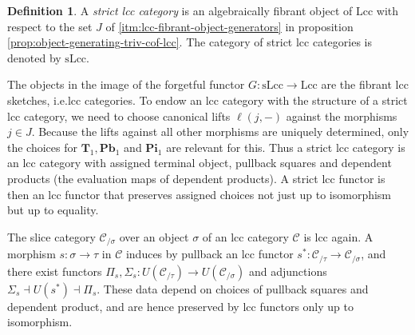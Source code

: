 \documentclass[a4paper]{article}
\theoremstyle{remark}
\theoremstyle{definition}
\newtheorem{definition}[theorem]{Definition}
\begin{document}
\begin{definition}
  A \emph{strict lcc category} is an algebraically fibrant object of $\mathrm{Lcc}$ with respect to the set $J$ of \ref{itm:lcc-fibrant-object-generators} in proposition \ref{prop:object-generating-triv-cof-lcc}.
  The category of strict lcc categories is denoted by $\mathrm{sLcc}$.
\end{definition}
The objects in the image of the forgetful functor $G : \mathrm{sLcc} \rightarrow \mathrm{Lcc}$ are the fibrant lcc sketches, i.e.\@ lcc categories.
To endow an lcc category with the structure of a strict lcc category, we need to choose canonical lifts $\ell(j, -)$ against the morphisms $j \in J$.
Because the lifts against all other morphisms are uniquely determined, only the choices for $\mathbf{T}_1, \mathbf{Pb}_1$ and $\mathbf{Pi}_1$ are relevant for this.
Thus a strict lcc category is an lcc category with assigned terminal object, pullback squares and dependent products (the evaluation maps of dependent products).
A strict lcc functor is then an lcc functor that preserves assigned choices not just up to isomorphism but up to equality.

The slice category $\mathcal{C}_{/ \sigma}$ over an object $\sigma$ of an lcc category $\mathcal{C}$ is lcc again.
A morphism $s : \sigma \rightarrow \tau$ in $\mathcal{C}$ induces by pullback an lcc functor $s^* : \mathcal{C}_{/ \tau} \rightarrow \mathcal{C}_{/ \sigma}$, and there exist functors $\Pi_s, \Sigma_s : U(\mathcal{C}_{/ \tau}) \rightarrow U(\mathcal{C}_{/ \sigma})$ and adjunctions $\Sigma_s \dashv U(s^*) \dashv \Pi_s$.
These data depend on choices of pullback squares and dependent product, and are hence preserved by lcc functors only up to isomorphism.
\end{document}
